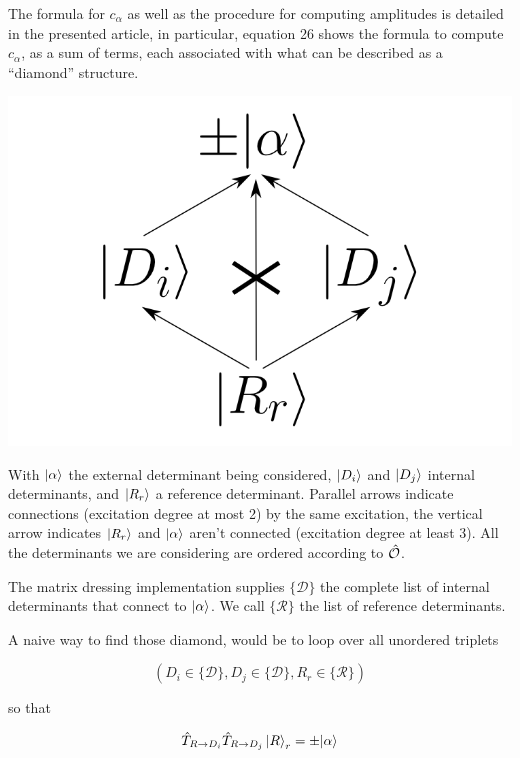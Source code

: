 \documentclass[./thesis.tex]{subfiles}
\begin{document}

The formula for $c_\alpha$ as well as the procedure for computing amplitudes is detailed in the presented article, in particular, equation 26 shows the formula to compute $c_\alpha$, as a sum of terms, each associated with what can be described as a ``diamond'' structure. 

	\begin{center}
		\includegraphics[width=0.3\columnwidth]{figures/matrix_dressing/diamond}
	\end{center}

With ${\ket{\alpha}}$ the external determinant being considered, $\ket {D_i}$ and $\ket {D_j}$ internal determinants, and $\ket {R_r}$ a reference determinant.  Parallel arrows indicate connections (excitation degree at most 2) by the same excitation, the vertical arrow indicates $\ket {R_r}$ and ${\ket{\alpha}}$ aren't connected (excitation degree at least 3). All the determinants we are considering are ordered according to ${\hat{\mathcal{O}}}$.

The matrix dressing implementation supplies $\{\mathcal{D}\}$ the complete list of internal determinants that connect to ${\ket{\alpha}}$. We call $\{\mathcal{R}\}$ the list of reference determinants.

A naive way to find those diamond, would be to loop over all unordered triplets 

\begin{equation}
(D_i \in \{\mathcal{D}\}, D_j \in \{\mathcal{D}\}, R_r \in \{\mathcal{R}\})
\end{equation}

so that

\begin{equation}
\hat T_{R \rightarrow D_i} \hat T_{R \rightarrow D_j} \ket R_r = \pm {\ket{\alpha}}
\end{equation}
\end{document}
